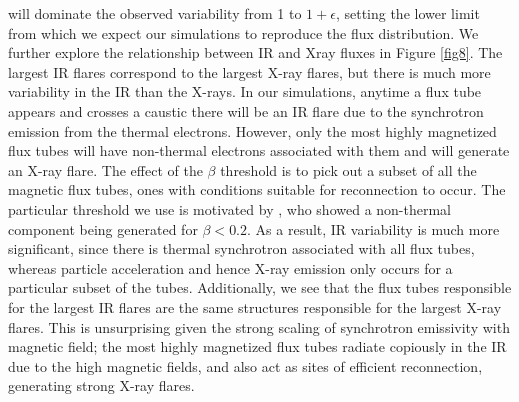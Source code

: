 will dominate the observed variability from 1 to $1+\epsilon$,
setting the lower limit from which we expect our simulations to reproduce the flux distribution.
We further explore the relationship between IR and Xray fluxes in Figure \ref{fig8}. The largest IR flares correspond
to the largest X-ray flares, but there is much more variability in the IR than the X-rays. In our simulations,
anytime a flux tube appears and crosses a caustic there
will be an IR flare due to the synchrotron emission from
the thermal electrons. However, only the most highly
magnetized flux tubes will have non-thermal electrons
associated with them and will generate an X-ray flare.
The effect of the $\beta$ threshold is to pick out a subset of all
the magnetic flux tubes, ones with conditions suitable for
reconnection to occur. The particular threshold we use is
motivated by \citet{liguo2015}, who showed a non-thermal
component being generated for $\beta < 0.2$. As a result, IR
variability is much more significant, since there is thermal synchrotron associated with all flux tubes, whereas
particle acceleration and hence X-ray emission only occurs for a particular subset of the tubes. Additionally,
we see that the flux tubes responsible for the largest IR
flares are the same structures responsible for the largest
X-ray flares. This is unsurprising given the strong scaling
of synchrotron emissivity with magnetic field; the most
highly magnetized flux tubes radiate copiously in the IR
due to the high magnetic fields, and also act as sites of
efficient reconnection, generating strong X-ray flares.
